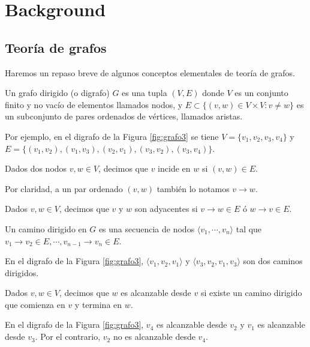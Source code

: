 \section{Background}

\subsection{Teoría de grafos}
Haremos un repaso breve de algunos conceptos elementales de teoría de grafos.

\begin{defi}
Un grafo dirigido (o digrafo) $G$ es una tupla $(V, E)$ donde $V$ es un conjunto finito y no vacío de elementos llamados nodos, y $E \subset \{(v, w) \in V \times V : v \neq w\}$ es un subconjunto de pares ordenados de vértices, llamados aristas.
\end{defi}

Por ejemplo, en el digrafo de la Figura \ref{fig:grafo3} se tiene $V = \{v_1, v_2, v_3, v_4\}$ y\\$E = \{(v_1, v_2), (v_1, v_3), (v_2, v_1), (v_3, v_2), (v_3, v_4)\}$.

\begin{defi}
Dados dos nodos $v, w \in V$, decimos que $v$ incide en $w$ si $(v, w) \in E$.
\end{defi}

Por claridad, a un par ordenado $(v, w)$ también lo notamos $v \to w$.

\begin{defi}
Dados $v, w \in V$, decimos que $v$ y $w$ son adyacentes si $v \to w \in E$ ó $w \to v \in E$.
\end{defi}

\begin{defi}
Un camino dirigido en $G$ es una secuencia de nodos $\langle v_1, \cdots, v_n \rangle$ tal que $v_1 \to v_2 \in E, \cdots, v_{n - 1} \to v_n \in E$.
\end{defi}

En el digrafo de la Figura \ref{fig:grafo3}, $\langle v_1, v_2, v_1 \rangle$ y $\langle v_3, v_2, v_1, v_3 \rangle$ son dos caminos dirigidos.

\begin{defi}
Dados $v, w \in V$, decimos que $w$ es alcanzable desde $v$ si existe un camino dirigido que comienza en $v$ y termina en $w$.
\end{defi}

En el digrafo de la Figura \ref{fig:grafo3}, $v_4$ es alcanzable desde $v_2$ y $v_1$ es alcanzable desde $v_3$. Por el contrario, $v_2$ no es alcanzable desde $v_4$.

